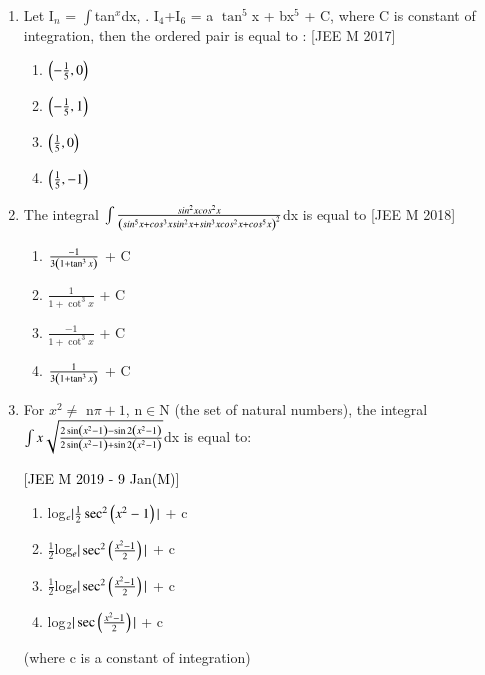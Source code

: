 \documentclass[journal,12pt,twocolumn]{IEEEtran}
\theoremstyle{remark}
\begin{document}
\begin{enumerate}[label=\textcolor{black}{\arabic*.}]
	\item Let I$_n$ = $\int$tan$^x$dx, . I$_4$+I$_6$ = a $\tan^5$x + bx$^5$ + C, where C is constant of integration, then the ordered pair  is equal to :
		\hfill{[JEE M 2017]}

		\begin{multicols}{4}
			\begin{enumerate}[label=(\alph*)]
				\item $\left(-\frac{1}{5}, 0\right)$
				\item $\left(-\frac{1}{5}, 1\right)$
				\item $\left(\frac{1}{5}, 0\right)$
				\item $\left(\frac{1}{5},-1\right)$
			\end{enumerate}
		\end{multicols}
		
	\item The integral $\int\frac{sin^2xcos^2x}{\left(sin^5x+cos^3xsin^2x+sin^3xcos^2x+cos^5x\right)^2}$dx is equal to
		\hfill{[JEE M 2018]}
		
		\begin{multicols}{2}
			\begin{enumerate}[label=(\alph*)]
				\item $\frac{-1}{3\left(1+\tan ^3x\right)}$ + C
				\item $\frac{1}{1+\cot ^3x}$ + C
				\item $\frac{-1}{1+\cot ^3x}$ + C
				\item $\frac{1}{3\left(1+\tan ^3x\right)}$ + C
			\end{enumerate}
		\end{multicols}
		
	\item For $x^2\neq$ n$\pi+1$, n$\in$N (the set of natural numbers), the integral $\int x\sqrt{\frac{2\sin \left(x^2-1\right)-\sin 2\left(x^2-1\right)}{2\sin \left(x^2-1\right)+\sin 2\left(x^2-1\right)}}$dx is equal to:

		\hfill{\textcolor{black}{[JEE M 2019 - 9 Jan(M)]}}

		\begin{multicols}{1}
			\begin{enumerate}[label=(\alph*)]
				\item log$_e|\frac{1}{2}\sec ^2\left(x^2-1\right)|$ + c
				\item $\frac{1}{2}$log$_e|\sec ^2\left(\frac{x^2-1}{2}\right)|$ + c
				\item $\frac{1}{2}$log$_e|\sec ^2\left(\frac{x^2-1}{2}\right)|$ + c
				\item log$_2|\sec \left(\frac{x^2-1}{2}\right)|$ + c
			\end{enumerate}
		\end{multicols}
		(where c is a constant of integration)


\end{enumerate}
\end{document}
